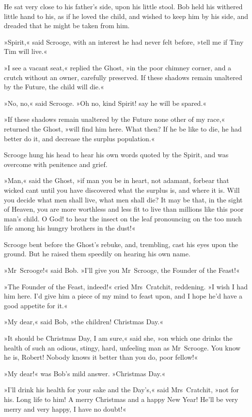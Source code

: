 He sat very close to his father's side, upon his little stool. Bob held his withered little hand to his, as if he loved the child, and wished to keep him by his side, and dreaded that he might be taken from him.

»Spirit,« said Scrooge, with an interest he had never felt before, »tell me if Tiny Tim will live.«

»I see a vacant seat,« replied the Ghost, »in the poor chimney corner, and a crutch without an owner, carefully preserved. If these shadows remain unaltered by the Future, the child will die.«

»No, no,« said Scrooge. »Oh no, kind Spirit! say he will be spared.«

»If these shadows remain unaltered by the Future none other of my race,« returned the Ghost, »will find him here. What then? If he be like to die, he had better do it, and decrease the surplus population.«

Scrooge hung his head to hear his own words quoted by the Spirit, and was overcome with penitence and grief.

»Man,« said the Ghost, »if man you be in heart, not adamant, forbear that wicked cant until you have discovered what the surplus is, and where it is. Will you decide what men shall live, what men shall die? It may be that, in the sight of Heaven, you are more worthless and less fit to live than millions like this poor man's child. O God! to hear the insect on the leaf pronouncing on the too much life among his hungry brothers in the dust!«

Scrooge bent before the Ghost's rebuke, and, trembling, cast his eyes upon the ground. But he raised them speedily on hearing his own name.

»Mr~Scrooge!« said Bob. »I'll give you Mr~Scrooge, the Founder of the Feast!«

»The Founder of the Feast, indeed!« cried Mrs~Cratchit, reddening. »I wish I had him here. I'd give him a piece of my mind to feast upon, and I hope he'd have a good appetite for it.«

»My dear,« said Bob, »the children! Christmas Day.«

»It should be Christmas Day, I am sure,« said she, »on which one drinks the health of such an odious, stingy, hard, unfeeling man as Mr~Scrooge. You know he is, Robert! Nobody knows it better than you do, poor fellow!«

»My dear!« was Bob's mild answer. »Christmas Day.«

»I'll drink his health for your sake and the Day's,« said Mrs~Cratchit, »not for his. Long life to him! A merry Christmas and a happy New Year! He'll be very merry and very happy, I have no doubt!«

